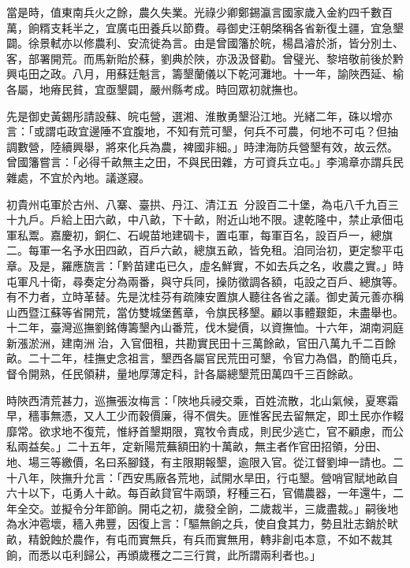 \begin{pinyinscope}
當是時，值東南兵火之餘，農久失業。光祿少卿鄭錫瀛言國家歲入金約四千數百萬，餉糈支耗半之，宜廣屯田養兵以節費。尋御史汪朝棨稱各省新復土疆，宜急墾闢。徐景軾亦以修農利、安流徙為言。由是曾國籓於皖，楊昌濬於浙，皆分別土、客，部署開荒。而馬新貽於蘇，劉典於陜，亦汲汲督勸。曾璧光、黎培敬前後於黔興屯田之政。八月，用蘇廷魁言，籌墾蘭儀以下乾河灘地。十一年，諭陜西延、榆各屬，地瘠民貧，宜亟墾闢，嚴州縣考成。時回眾初就撫也。

先是御史黃錫彤請設蘇、皖屯營，選湘、淮散勇墾沿江地。光緒二年，硃以增亦言：「或謂屯政宜邊陲不宜腹地，不知有荒可墾，何兵不可農，何地不可屯？但抽調數營，陸續興舉，將來化兵為農，裨國非細。」時津海防兵營墾有效，故云然。曾國籓嘗言：「必得千畝無主之田，不與民田雜，方可資兵立屯。」李鴻章亦謂兵民雜處，不宜於內地。議遂寢。

初貴州屯軍於古州、八寨、臺拱、丹江、清江五，分設百二十堡，為屯八千九百三十九戶。戶給上田六畝，中八畝，下十畝，附近山地不限。逮乾隆中，禁止承佃屯軍私鬻。嘉慶初，銅仁、石峴苗地建碉卡，置屯軍，每軍百名，設百戶一，總旗二。每軍一名予水田四畝，百戶六畝，總旗五畝，皆免租。洎同治初，更定黎平屯章。及是，羅應旒言：「黔苗建屯已久，虛名鮮實，不如去兵之名，收農之實。」時屯軍凡十衛，尋奏定分為兩番，與守兵同，操防徵調各額，屯設之百戶、總旗等。有不力者，立時革替。先是沈桂芬有疏陳安置旗人聽往各省之議。御史黃元善亦稱山西暨江蘇等省開荒，當仿雙城堡舊章，令旗民移墾。顧以事體艱鉅，未盡舉也。十二年，臺灣巡撫劉銘傳籌墾內山番荒，伐木變價，以資撫恤。十六年，湖南洞庭新漲淤洲，建南洲治，入官佃租，共勘實民田十三萬餘畝，官田八萬九千二百餘畝。二十二年，桂撫史念祖言，墾西各屬官民荒田可墾，令官力為倡，酌簡屯兵，督令開熟，任民領耕，量地厚薄定科，計各屬總墾荒田萬四千三百餘畝。

時陜西清荒甚力，巡撫張汝梅言：「陜地兵祲交乘，百姓流散，北山氣候，夏寒霜早，穡事無憑，又人工少而穀價廉，得不償失。匪惟客民去留無定，即土民亦作輟靡常。欲求地不復荒，惟紓首墾期限，寬牧令責成，則民少逃亡，官不顧慮，而公私兩益矣。」二十五年，定新陽荒蕪額田約十萬畝，無主者作官田招領，分田、地、場三等繳價，名曰系腳錢，有主限期報墾，逾限入官。從江督劉坤一請也。二十八年，陜撫升允言：「西安馬廠各荒地，試開水旱田，行屯墾。營哨官賦地畝自六十以下，屯勇人十畝。每百畝貸官牛兩頭，籽種三石，官備農器，一年還牛，二年全交。並擬令分年節餉。開屯之初，歲發全餉，二歲裁半，三歲盡裁。」嗣後地為水沖雹壞，穡入弗豐，因復上言：「驅無餉之兵，使自食其力，勢且壯志銷於畎畝，精銳蝕於農作，有屯而實無兵，有兵而實無用，轉非創屯本意，不如不裁其餉，而悉以屯利歸公，再頒歲穫之二三行賞，此所謂兩利者也。」


\end{pinyinscope}
